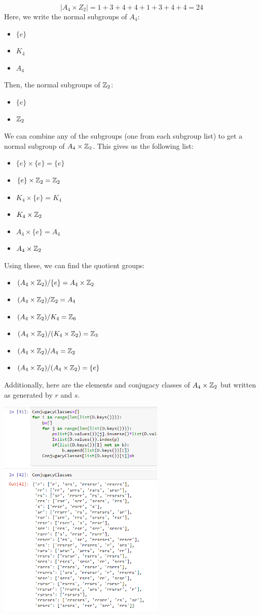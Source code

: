 \documentclass[12pt]{report}
\begin{document}
$$|A_4 \times Z_2| = 1 + 3 + 4 + 4 + 1 + 3 + 4 + 4 = 24$$
\newpage
Here, we write the normal subgroups of $A_4$:
\begin{itemize}
    \item $\{e\}$
    \item $K_4$
    \item $A_4$
\end{itemize}
Then, the normal subgroups of $\ZZ_2$:
\begin{itemize}
    \item $\{e\}$
    \item $\ZZ_2$
\end{itemize}
We can combine any of the subgroups (one from each subgroup list) to get a normal subgroup of $A_4 \times \ZZ_2$. This gives us the following list:
\begin{itemize}
    \item $\{e\} \times \{e\} = \{e\}$
    \item $\{e\} \times \ZZ_2 = \ZZ_2$
    \item $K_4 \times \{e\} = K_4$
    \item $K_4 \times \ZZ_2$
    \item $A_4 \times \{e\} = A_4$
    \item $A_4 \times \ZZ_2$
\end{itemize}
Using these, we can find the quotient groups:
\begin{itemize}
    \item $(A_4 \times \ZZ_2) / \{e\} = A_4 \times \ZZ_2$
    \item $(A_4 \times \ZZ_2) / \ZZ_2 = A_4 $
    \item $(A_4 \times \ZZ_2) / K_4 = \ZZ_6$
    \item $(A_4 \times \ZZ_2) / (K_4 \times \ZZ_2) = \ZZ_3$
    \item $(A_4 \times \ZZ_2) / A_4 = \ZZ_2$
    \item $(A_4 \times \ZZ_2) / (A_4 \times \ZZ_2) = \{e\}$
\end{itemize}
\newpage
Additionally, here are the elements and conjugacy classes of $A_4 \times \ZZ_2$ but written as generated by $r$ and $s$.

\includegraphics*[width=0.6\textwidth]{conjugacyclasses.png}
\end{document}

